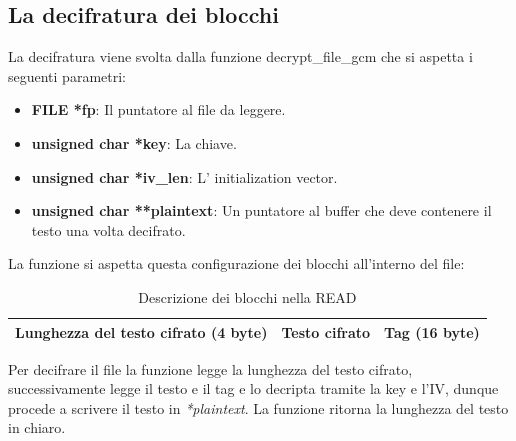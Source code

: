\subsection{La decifratura dei blocchi}
La decifratura viene svolta dalla funzione decrypt\_file\_gcm che si aspetta i seguenti parametri:
 \begin{itemize}
        \item \textbf{FILE *fp}: Il puntatore al file da leggere.
        \item \textbf{unsigned char *key}: La chiave.
        \item \textbf{unsigned char *iv\_len}: L' initialization vector.
        \item \textbf{unsigned char **plaintext}: Un puntatore al buffer che deve contenere il testo una volta decifrato.
    \end{itemize}
La funzione si aspetta questa configurazione dei blocchi all'interno del file:
\begin{table}[htbp]
        \centering
        \begin{tabular}{|l|l|l|}
            \hline
            Lunghezza del testo cifrato (4 byte) & Testo cifrato & Tag (16 byte)\\
            \hline
        \end{tabular}
        \caption{Descrizione dei blocchi nella READ}
    \label{tab:tabella-blocchi-read}
\end{table}

Per decifrare il file la funzione legge la lunghezza del testo cifrato, successivamente legge il testo e il tag e lo decripta tramite la key e l'IV, dunque procede a scrivere il testo in \textit{*plaintext}. La funzione ritorna la lunghezza del testo in chiaro.

